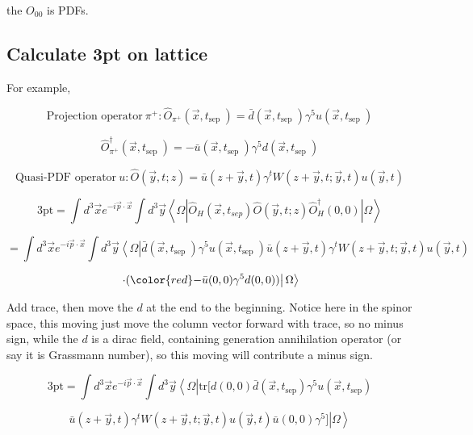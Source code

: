 \documentclass[11pt]{article} %
\begin{document}
the $O_{00}$ is PDFs.





\subsection{Calculate 3pt on lattice}

For example,

\[ \text{Projection operator}\ \pi^+: \hat{O}_{\pi^+}\left(\vec{x}, t_{\text {sep }}\right)=\bar{d}\left(\vec{x}, t_{\text {sep }}\right) \gamma^{5} u\left(\vec{x}, t_{\text {sep }}\right) \]

\[ \hat{O}^{\dagger}_{\pi^+}\left(\vec{x}, t_{\text {sep }}\right)=- \bar{u}\left(\vec{x}, t_{\text {sep }}\right) \gamma^{5} d\left(\vec{x}, t_{\text {sep }}\right) \]

\[ \text{Quasi-PDF operator}\ u: \hat{O}(\vec{y}, t ; z)=\bar{u}(z+\vec{y}, t) \gamma^{t} W(z+\vec{y}, t ; \vec{y}, t) u(\vec{y}, t) \]


\[ \text{3pt} = \int d^{3} \vec{x} e^{-i \vec{p} \cdot \vec{x}} \int d^3 \vec{y}\left\langle\Omega\left|\hat{O}_{H}\left(\vec{x}, t_{s e p}\right) \hat{O}(\vec{y}, t ; z) \hat{O}_{H}^{\dagger}(0,0)\right| \Omega\right\rangle \]

\[ = \int d^{3} \vec{x} e^{-i \vec{p} \cdot \vec{x}} \int d^3 \vec{y}\left\langle\Omega\left|\bar{d}\left(\vec{x}, t_{\text {sep }}\right) \gamma^{5} u\left(\vec{x}, t_{\text {sep }}\right) \bar{u}(z+\vec{y}, t) \gamma^{t} W(z+\vec{y}, t ; \vec{y}, t) u(\vec{y}, t) \right.\right.\]

\[\left. \left. \cdot ( {\color{red}-} \bar{u}(0, 0) \gamma^{5} d(0, 0) )  \right| \Omega\right\rangle \]

Add trace, then move the $d$ at the end to the beginning. {\color{red} Notice here in the spinor space, this moving just move the column vector forward with trace, so no minus sign, while the $d$ is a dirac field, containing generation annihilation operator (or say it is Grassmann number), so this moving will contribute a minus sign. }

\[ \text{3pt} = \int d^{3} \vec{x} e^{-i \vec{p} \cdot \vec{x}} \int d^3 \vec{y}\left\langle\Omega\left| \text{tr}[ d(0, 0) \bar{d}\left(\vec{x}, t_{\text {sep}}\right) \gamma^{5} u\left(\vec{x}, t_{\text {sep}}\right)   \right.\right.\]

\[\left. \left. \bar{u}(z+\vec{y}, t) \gamma^{t} W(z+\vec{y}, t ; \vec{y}, t) u(\vec{y}, t)  \bar{u}(0, 0) \gamma^{5}  ] \right| \Omega\right\rangle \]
\end{document}
